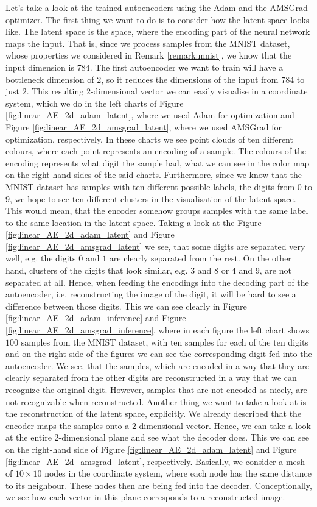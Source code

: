 Let's take a look at the trained autoencoders using the Adam and the AMSGrad optimizer. The first thing we want to do is to consider how the latent space looks like. The latent space is the space, where the encoding part of the neural network maps the input. That is, since we process samples from the MNIST dataset, whose properties we considered in Remark \ref{remark:mnist}, we know that the input dimension is $784$. The first autoencoder we want to train will have a bottleneck dimension of $2$, so it reduces the dimensions of the input from $784$ to just $2$. This resulting $2$-dimensional vector we can easily visualise in a coordinate system, which we do in the left charts of Figure \ref{fig:linear_AE_2d_adam_latent}, where we used Adam for optimization and Figure \ref{fig:linear_AE_2d_amsgrad_latent}, where we used AMSGrad for optimization, respectively. In these charts we see point clouds of ten different colours, where each point represents an encoding of a sample. The colours of the encoding represents what digit the sample had, what we can see in the color map on the right-hand sides of the said charts. Furthermore, since we know that the MNIST dataset has samples with ten different possible labels, the digits from $0$ to $9$, we hope to see ten different clusters in the visualisation of the latent space. This would mean, that the encoder somehow \glqq groups\grqq{} samples with the same label to the same location in the latent space. Taking a look at the Figure \ref{fig:linear_AE_2d_adam_latent} and Figure \ref{fig:linear_AE_2d_amsgrad_latent} we see, that some digits are separated very well, e.g. the digits $0$ and $1$ are clearly separated from the rest. On the other hand, clusters of the digits that look similar, e.g. $3$ and $8$ or $4$ and $9$, are not separated at all. Hence, when feeding the encodings into the decoding part of the autoencoder, i.e. reconstructing the image of the digit, it will be hard to see a difference between those digits. This we can see clearly in Figure \ref{fig:linear_AE_2d_adam_inference} and Figure \ref{fig:linear_AE_2d_amsgrad_inference}, where in each figure the left chart shows $100$ samples from the MNIST dataset, with ten samples for each of the ten digits and on the right side of the figures we can see the corresponding digit fed into the autoencoder. We see, that the samples, which are encoded in a way that they are clearly separated from the other digits are reconstructed in a way that we can recognize the original digit. However, samples that are not encoded as nicely, are not recognizable when reconstructed. Another thing we want to take a look at is the reconstruction of the latent space, explicitly. We already described that the encoder maps the samples onto a $2$-dimensional vector. Hence, we can take a look at the entire $2$-dimensional plane and see what the decoder does. This we can see on the right-hand side of Figure \ref{fig:linear_AE_2d_adam_latent} and Figure \ref{fig:linear_AE_2d_amsgrad_latent}, respectively. Basically, we consider a mesh of $10\times 10$ nodes in the coordinate system, where each node has the same distance to its neighbour. These nodes then are being fed into the decoder. Conceptionally, we see how each vector in this plane corresponds to a reconstructed image.\\

